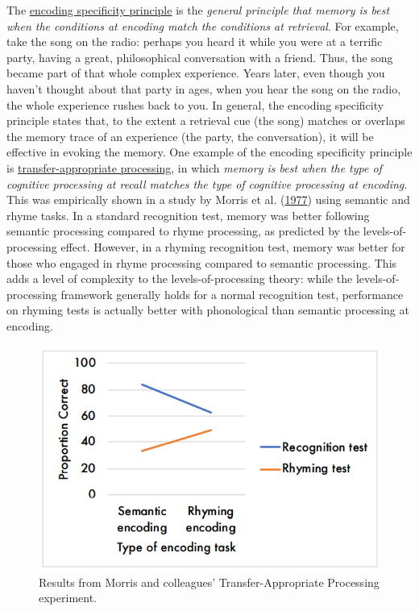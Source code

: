 \documentclass[
]{krantz}
\begin{document}
The \protect\hyperlink{encoding-specificity-principle}{encoding specificity principle} is the \emph{general principle that memory is best when the conditions at encoding match the conditions at retrieval}. For example, take the song on the radio: perhaps you heard it while you were at a terrific party, having a great, philosophical conversation with a friend. Thus, the song became part of that whole complex experience. Years later, even though you haven't thought about that party in ages, when you hear the song on the radio, the whole experience rushes back to you. In general, the encoding specificity principle states that, to the extent a retrieval cue (the song) matches or overlaps the memory trace of an experience (the party, the conversation), it will be effective in evoking the memory. One example of the encoding specificity principle is \protect\hyperlink{transfer-appropriate-processing}{transfer-appropriate processing}, in which \emph{memory is best when the type of cognitive processing at recall matches the type of cognitive processing at encoding}. This was empirically shown in a study by Morris et al. (\protect\hyperlink{ref-Morris1977}{1977}) using semantic and rhyme tasks. In a standard recognition test, memory was better following semantic processing compared to rhyme processing, as predicted by the levels-of-processing effect. However, in a rhyming recognition test, memory was better for those who engaged in rhyme processing compared to semantic processing. This adds a level of complexity to the levels-of-processing theory: while the levels-of-processing framework generally holds for a normal recognition test, performance on rhyming tests is actually better with phonological than semantic processing at encoding.

\begin{figure}

{\centering \includegraphics[width=0.6\linewidth]{images/ch5/fig6} 

}

\caption{Results from Morris and colleagues’ Transfer-Appropriate Processing experiment.}\label{fig:morris}
\end{figure}
\end{document}
